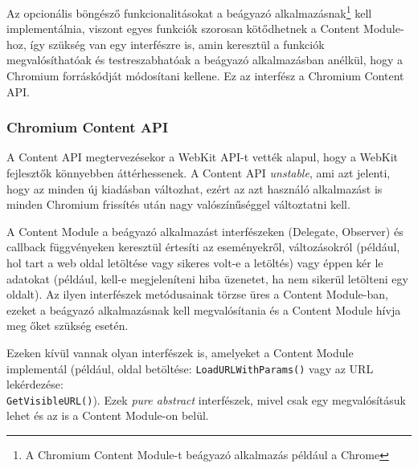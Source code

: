 \documentclass[12pt]{report}
\begin{document}
Az opcionális böngésző funkcionalitásokat a beágyazó
alkalmazásnak\footnote{A Chromium Content Module-t beágyazó alkalmazás például a Chrome}
kell implementálnia, viszont egyes funkciók szorosan kötődhetnek a Content Module-hoz,
így szükség van egy interfészre is, amin keresztül a funkciók megvalósíthatóak és
testreszabhatóak a beágyazó alkalmazásban anélkül, hogy a Chromium forráskódját módosítani
kellene. Ez az interfész a Chromium Content API.

\subsubsection{Chromium Content API}
A Content API megtervezésekor a WebKit API-t vették alapul, hogy a WebKit fejlesztők
könnyebben áttérhessenek. A Content API \textit{unstable}, ami azt jelenti, hogy az minden
új kiadásban változhat, ezért az azt használó alkalmazást is minden Chromium frissítés után
nagy valószínűséggel változtatni kell.

A Content Module a beágyazó alkalmazást interfészeken (Delegate, Observer)
és callback függvényeken keresztül értesíti az eseményekről, változásokról (például,
hol tart a web oldal letöltése vagy sikeres volt-e a letöltés) vagy éppen
kér le adatokat (például, kell-e megjeleníteni hiba üzenetet, ha nem sikerül letölteni egy
oldalt). Az ilyen interfészek metódusainak törzse üres a Content Module-ban, ezeket a
beágyazó alkalmazásnak kell megvalósítania és a Content Module hívja meg őket szükség esetén.

Ezeken kívül vannak olyan interfészek is, amelyeket a Content Module implementál
(például, oldal betöltése: \texttt{LoadURLWithParams()} vagy az URL lekérdezése: \\
\texttt{GetVisibleURL()}).
Ezek \textit{pure abstract} interfészek, mivel csak egy megvalósításuk lehet
és az is a Content Module-on belül. \cite{bib:chromium-content-api}
\end{document}
